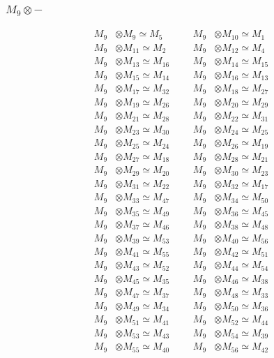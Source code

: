 \subsubsection{$ M_{9}\otimes -$}
\begin{align*}
M_{9} &\otimes M_{9} \simeq M_{5} &&& M_{9} &\otimes M_{10} \simeq M_{1}\\
M_{9} &\otimes M_{11} \simeq M_{2} &&& M_{9} &\otimes M_{12} \simeq M_{4}\\
M_{9} &\otimes M_{13} \simeq M_{16} &&& M_{9} &\otimes M_{14} \simeq M_{15}\\
M_{9} &\otimes M_{15} \simeq M_{14} &&& M_{9} &\otimes M_{16} \simeq M_{13}\\
M_{9} &\otimes M_{17} \simeq M_{32} &&& M_{9} &\otimes M_{18} \simeq M_{27}\\
M_{9} &\otimes M_{19} \simeq M_{26} &&& M_{9} &\otimes M_{20} \simeq M_{29}\\
M_{9} &\otimes M_{21} \simeq M_{28} &&& M_{9} &\otimes M_{22} \simeq M_{31}\\
M_{9} &\otimes M_{23} \simeq M_{30} &&& M_{9} &\otimes M_{24} \simeq M_{25}\\
M_{9} &\otimes M_{25} \simeq M_{24} &&& M_{9} &\otimes M_{26} \simeq M_{19}\\
M_{9} &\otimes M_{27} \simeq M_{18} &&& M_{9} &\otimes M_{28} \simeq M_{21}\\
M_{9} &\otimes M_{29} \simeq M_{20} &&& M_{9} &\otimes M_{30} \simeq M_{23}\\
M_{9} &\otimes M_{31} \simeq M_{22} &&& M_{9} &\otimes M_{32} \simeq M_{17}\\
M_{9} &\otimes M_{33} \simeq M_{47} &&& M_{9} &\otimes M_{34} \simeq M_{50}\\
M_{9} &\otimes M_{35} \simeq M_{49} &&& M_{9} &\otimes M_{36} \simeq M_{45}\\
M_{9} &\otimes M_{37} \simeq M_{46} &&& M_{9} &\otimes M_{38} \simeq M_{48}\\
M_{9} &\otimes M_{39} \simeq M_{53} &&& M_{9} &\otimes M_{40} \simeq M_{56}\\
M_{9} &\otimes M_{41} \simeq M_{55} &&& M_{9} &\otimes M_{42} \simeq M_{51}\\
M_{9} &\otimes M_{43} \simeq M_{52} &&& M_{9} &\otimes M_{44} \simeq M_{54}\\
M_{9} &\otimes M_{45} \simeq M_{35} &&& M_{9} &\otimes M_{46} \simeq M_{38}\\
M_{9} &\otimes M_{47} \simeq M_{37} &&& M_{9} &\otimes M_{48} \simeq M_{33}\\
M_{9} &\otimes M_{49} \simeq M_{34} &&& M_{9} &\otimes M_{50} \simeq M_{36}\\
M_{9} &\otimes M_{51} \simeq M_{41} &&& M_{9} &\otimes M_{52} \simeq M_{44}\\
M_{9} &\otimes M_{53} \simeq M_{43} &&& M_{9} &\otimes M_{54} \simeq M_{39}\\
M_{9} &\otimes M_{55} \simeq M_{40} &&& M_{9} &\otimes M_{56} \simeq M_{42}\\
\end{align*}

